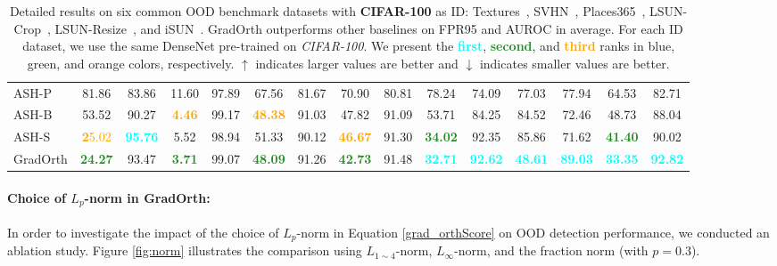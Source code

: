 \documentclass{article}
\begin{document}
\begin{table}
{\begin{tabular}{|l|c|c|c|c|c|c|c|c|c|c|c|c|c|c|}
ASH-P & 81.86 & 83.86 & 11.60 & 97.89 & 67.56 & 81.67 & 70.90 & 80.81 & 78.24 & 74.09 & 77.03 & 77.94 & 64.53 & 82.71\\
ASH-B & 53.52 & 90.27 & \textcolor{orange}{\textbf{4.46}} & 99.17 & \textcolor{orange}{\textbf{48.38}} & 91.03 & 47.82 & 91.09 & 53.71 & 84.25 & 84.52 & 72.46 & 48.73 & 88.04 \\
ASH-S  & \textcolor{orange}{\textbf25.02} & \textcolor{cyan}{\textbf\textbf{95.76}} & 5.52 & 98.94 & 51.33 & 90.12 & \textcolor{orange}{\textbf{46.67}} & 91.30 & \textcolor{ForestGreen}{\textbf{34.02}} & 92.35 & 85.86 & 71.62 & \textcolor{ForestGreen}{\textbf{41.40}} & 90.02 \\
GradOrth & \textcolor{ForestGreen}{\textbf{24.27}} & 93.47 & \textcolor{ForestGreen}{\textbf{3.71}} &99.07 & \textcolor{ForestGreen}{\textbf{48.09}}& 91.26&\textcolor{ForestGreen}{\textbf{42.73}}&91.48&\textcolor{cyan}{\textbf{32.71}}&\textcolor{cyan}{\textbf{92.62}}&\textcolor{cyan}{\textbf{48.61}}&\textcolor{cyan}{\textbf{89.03}}&\textcolor{cyan}{\textbf{33.35}}&\textcolor{cyan}{\textbf{92.82}}\\
\bottomrule
\end{tabular}}
\caption{ Detailed results on six common OOD benchmark datasets with \textbf{CIFAR-100} as ID: Textures~\cite{cimpoi2014describing}, SVHN~\cite{netzer2011reading}, Places365~\cite{zhou2017places}, LSUN-Crop~\cite{yu2015lsun}, LSUN-Resize~\cite{yu2015lsun}, and iSUN~\cite{xu2015turkergaze}. GradOrth outperforms other baselines on FPR95 and AUROC in average. For each ID dataset, we use the same DenseNet pre-trained on \textit{CIFAR-100}. We present the \textcolor{cyan}{\textbf{first}}, \textcolor{ForestGreen}{\textbf{second}}, and \textcolor{orange}{\textbf{third}} ranks in blue, green, and orange colors, respectively. $\uparrow$ indicates larger values are better and $\downarrow$ indicates smaller values are better. }
\label{tab:cifar100}
\vspace{-6mm}
\end{table}
\paragraph{Choice of $L_p$-norm in GradOrth: }In order to investigate the impact of the choice of $L_p$-norm in Equation \ref{grad_orthScore} on OOD detection performance, we conducted an ablation study. Figure \ref{fig:norm} illustrates the comparison using $L_{1 \sim 4}$-norm, $L_{\infty}$-norm, and the fraction norm (with $p=0.3$).
\end{document}
